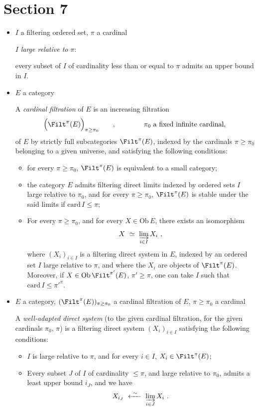 \section*{Section 7}

\begin{itemize}
\item[\textbullet] $I$ a filtering ordered set, \quad $\pi$ a cardinal

$I$ \textit{large relative to} $\pi$:

every subset of $I$ of cardinality less than or equal to $\pi$ admits an upper bound in $I$.

\item[\textbullet] $E$ a category

A \textit{cardinal filtration} of $E$ is an increasing filtration
\[
\Big(\Filt^{\pi}(E)\Big)_{\pi\geq\pi_0} \qquad , \qquad\qquad \pi_0 \text{ a fixed infinite cardinal,}
\]
of $E$ by strictly full subcategories $\Filt^{\pi}(E)$, indexed by the cardinals $\pi \geq \pi_0$ belonging to a given universe, and satisfying the following conditions:
\begin{itemize}
\item[\textit{a})] for every $\pi \geq \pi_0$, $\Filt^{\pi}(E)$ is equivalent to a small category;
\item[\textit{b})] the category $E$ admits filtering direct limits indexed by ordered sets $I$ large relative to $\pi_0$, and for every $\pi \geq \pi_0$, $\Filt^{\pi}(E)$ is stable under the said limits if $\mathrm{card}\, I \leq \pi$;
\item[\textit{c})] For every $\pi \geq \pi_0$, and for every $X \in \mathrm{Ob}\, E$, there exists an isomorphism
\[
X \ \simeq\ \varinjlim_{i\in I} X_i \ ,
\]
where $(X_i)_{i\in I}$ is a filtering direct system in $E$, indexed by an ordered set $I$ large relative to $\pi$, and where the $X_i$ are objects of $\Filt^{\pi}(E)$. Moreover, if $X \in \mathrm{Ob}\,\Filt^{\pi'}(E)$, $\pi' \geq \pi$, one can take $I$ such that $\mathrm{card}\, I \leq \pi'^{\pi}$.
\end{itemize}

\item[\textbullet] $E$ a category, \quad $(\Filt^{\pi}(E))_{\pi\geq\pi_0}$ a cardinal filtration of $E$, \quad $\pi \geq \pi_0$ a cardinal

A \textit{well-adapted direct system} (to the given cardinal filtration, for the given cardinals $\pi_0$, $\pi$) is a filtering direct system $(X_i)_{i\in I}$ satisfying the following conditions:
\begin{itemize}
\item[\textit{a})] $I$ is large relative to $\pi$, and for every $i \in I$, $X_i \in \Filt^{\pi}(E)$;
\item[\textit{b})] Every subset $J$ of $I$ of cardinality $\leq \pi$, and large relative to $\pi_0$, admits a least upper bound $i_J$, and we have
\[
X_{i_J} \ \xleftarrow{\ \sim\ }\ \varinjlim_{i\in J} X_i \ .
\]
\end{itemize}


\end{itemize}
